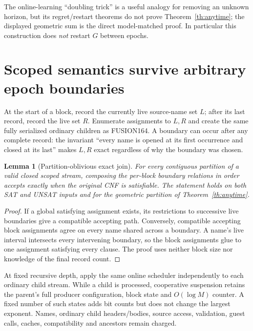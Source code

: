 \documentclass[11pt]{article}
\newtheorem{lemma}[theorem]{Lemma}
\begin{document}
The online-learning ``doubling trick'' is a useful analogy for removing an
unknown horizon, but its regret/restart theorems do not prove
Theorem~\ref{th:anytime}; the displayed geometric sum is the direct
model-matched proof.  In particular this construction does \emph{not} restart
$G$ between epochs.

\section{Scoped semantics survive arbitrary epoch boundaries}
At the start of a block, record the currently live source-name set $L$; after
its last record, record the live set $R$.  Enumerate assignments to $L,R$ and
create the same fully serialized ordinary children as FUSION164.  A boundary
can occur after any complete record: the invariant ``every name is opened at
its first occurrence and closed at its last'' makes $L,R$ exact regardless of
why the boundary was chosen.

\begin{lemma}[Partition-oblivious exact join]\label{lem:join}
For every contiguous partition of a valid closed scoped stream, composing the
per-block boundary relations in order accepts exactly when the original CNF is
satisfiable.  The statement holds on both SAT and UNSAT inputs and for the
geometric partition of Theorem~\ref{th:anytime}.
\end{lemma}
\begin{proof}
If a global satisfying assignment exists, its restrictions to successive live
boundaries give a compatible accepting path.  Conversely, compatible accepting
block assignments agree on every name shared across a boundary.  A name's live
interval intersects every intervening boundary, so the block assignments glue
to one assignment satisfying every clause.  The proof uses neither block size
nor knowledge of the final record count.
\end{proof}

At fixed recursive depth, apply the same online scheduler independently to each
ordinary child stream.  While a child is processed, cooperative suspension
retains the parent's full producer configuration, block state and $O(\log M)$
counter.  A fixed number of such states adds bit counts but does not change the
largest exponent.  Names, ordinary child headers/bodies, source access,
validation, guest calls, caches, compatibility and ancestors remain charged.
\end{document}
